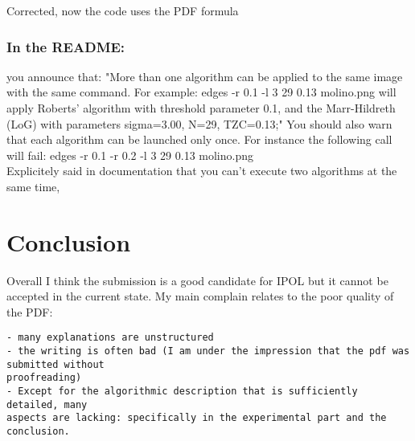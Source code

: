 \documentclass[a4paper,10pt]{report}
\begin{document}
\ans Corrected, now  the code uses the PDF formula\\

\subsubsection{ In the README:}
\que you announce that:
"More than one algorithm can be applied to the same image with the same
command. For example:
edges -r 0.1 -l 3 29 0.13 molino.png
will apply Roberts' algorithm with threshold parameter 0.1, and the
Marr-Hildreth (LoG) with parameters sigma=3.00, N=29, TZC=0.13;"
You should also warn that each algorithm can be launched only once. For instance
the following call will fail:
edges -r 0.1 -r 0.2 -l 3 29 0.13 molino.png\\

\ans Explicitely said in documentation that you can't execute two algorithms at the same time,\\


\section{ Conclusion}
Overall I think the submission is a good candidate for IPOL but it cannot be
accepted in the current state. My main complain relates to the poor quality of
the PDF:
\begin{verbatim}
- many explanations are unstructured
- the writing is often bad (I am under the impression that the pdf was submitted without
proofreading)
- Except for the algorithmic description that is sufficiently detailed, many
aspects are lacking: specifically in the experimental part and the conclusion.
\end{verbatim}




\end{document}
